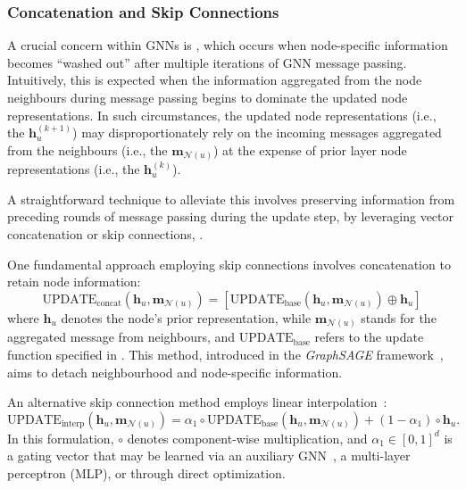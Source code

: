 \subsubsection{Concatenation and Skip Connections} 
A crucial concern within GNNs is , which occurs when node-specific information becomes ``washed out''  after multiple iterations of GNN message passing. Intuitively, this is expected when the information aggregated from the node neighbours during message passing begins to dominate the updated node representations. In such circumstances, the updated node representations (i.e., the $ \mathbf{h}_u^{(k+1)} $) may disproportionately rely on the incoming messages aggregated from the neighbours (i.e., the $ \mathbf{m}_{\mathcal{N}(u)} $) at the expense of prior layer node representations (i.e., the $ \mathbf{h}_u^{(k)} $).

A straightforward technique to alleviate this involves preserving information from preceding rounds of message passing during the update step, by leveraging vector concatenation or skip connections, .

\medskip

One fundamental approach employing skip connections involves concatenation to retain node information:
\begin{equation*}
\text{UPDATE}_{\text{concat}}(\mathbf{h}_u, \mathbf{m}_{\mathcal{N}(u)}) = [\text{UPDATE}_{\text{base}}(\mathbf{h}_u, \mathbf{m}_{\mathcal{N}(u)}) \oplus \mathbf{h}_u]
\end{equation*}
where $ \mathbf{h}_u $ denotes the node’s prior representation, while $ \mathbf{m}_{\mathcal{N}(u)}$ stands for the aggregated message from neighbours, and $ \text{UPDATE}_{\text{base}} $ refers to the update function specified in . This method, introduced in the \textit{GraphSAGE} framework~\cite{Hamilton2017inductiveRepresentationLearning}, aims to detach neighbourhood and node-specific information.

An alternative skip connection method employs linear interpolation~\cite{Pham2017columnNetworksCollectiveClassification}:
\begin{equation*}
\text{UPDATE}_{\text{interp}}(\mathbf{h}_u, \mathbf{m}_{\mathcal{N}(u)}) = \alpha_1 \circ \text{UPDATE}_{\text{base}}(\mathbf{h}_u, \mathbf{m}_{\mathcal{N}(u)}) + (1 - \alpha_1) \circ \mathbf{h}_u.
\end{equation*}
In this formulation, $ \circ $ denotes component-wise multiplication, and $ \alpha_1 \in [0,1]^d $ is a gating vector that may be learned via an auxiliary GNN~\cite{Pham2017columnNetworksCollectiveClassification}, a multi-layer perceptron (MLP), or through direct optimization.

